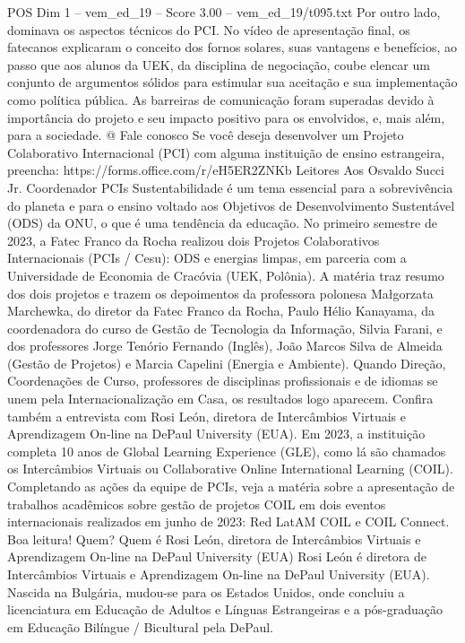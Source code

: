 \begin{textsample}{POS Dim 1 – vem\_ed\_19 – Score 3.00 – vem\_ed\_19/t095.txt}
Por outro lado, dominava os aspectos técnicos do PCI.
No vídeo de apresentação final, os fatecanos explicaram o conceito dos fornos solares, suas vantagens e benefícios, ao passo que aos alunos da UEK, da disciplina de negociação, coube elencar um conjunto de argumentos sólidos para estimular sua aceitação e sua implementação como política pública.
As barreiras de comunicação foram superadas devido à importância do projeto e seu impacto positivo para os envolvidos, e, mais além, para a sociedade. @ Fale conosco Se você deseja desenvolver um Projeto Colaborativo Internacional (PCI) com alguma instituição de ensino estrangeira, preencha: https://forms.office.com/r/eH5ER2ZNKb Leitores Aos Osvaldo Succi Jr.
Coordenador PCIs Sustentabilidade é um tema essencial para a sobrevivência do planeta e para o ensino voltado aos Objetivos de Desenvolvimento Sustentável (ODS) da ONU, o que é uma tendência da educação.
No primeiro semestre de 2023, a Fatec Franco da Rocha realizou dois Projetos Colaborativos Internacionais (PCIs / Cesu): ODS e energias limpas, em parceria com a Universidade de Economia de Cracóvia (UEK, Polônia).
A matéria traz resumo dos dois projetos e trazem os depoimentos da professora polonesa Małgorzata Marchewka, do diretor da Fatec Franco da Rocha, Paulo Hélio Kanayama, da coordenadora do curso de Gestão de Tecnologia da Informação, Silvia Farani, e dos professores Jorge Tenório Fernando (Inglês), João Marcos Silva de Almeida (Gestão de Projetos) e Marcia Capelini (Energia e Ambiente).
Quando Direção, Coordenações de Curso, professores de disciplinas profissionais e de idiomas se unem pela Internacionalização em Casa, os resultados logo aparecem.
Confira também a entrevista com Rosi León, diretora de Intercâmbios Virtuais e Aprendizagem On-line na DePaul University (EUA).
Em 2023, a instituição completa 10 anos de Global Learning Experience (GLE), como lá são chamados os Intercâmbios Virtuais ou Collaborative Online International Learning (COIL).
Completando as ações da equipe de PCIs, veja a matéria sobre a apresentação de trabalhos acadêmicos sobre gestão de projetos COIL em dois eventos internacionais realizados em junho de 2023: Red LatAM COIL e COIL Connect.
Boa leitura!
Quem?
Quem é Rosi León, diretora de Intercâmbios Virtuais e Aprendizagem On-line na DePaul University (EUA) Rosi León é diretora de Intercâmbios Virtuais e Aprendizagem On-line na DePaul University (EUA).
Nascida na Bulgária, mudou-se para os Estados Unidos, onde concluiu a licenciatura em Educação de Adultos e Línguas Estrangeiras e a pós-graduação em Educação Bilíngue / Bicultural pela DePaul.

\end{textsample}
